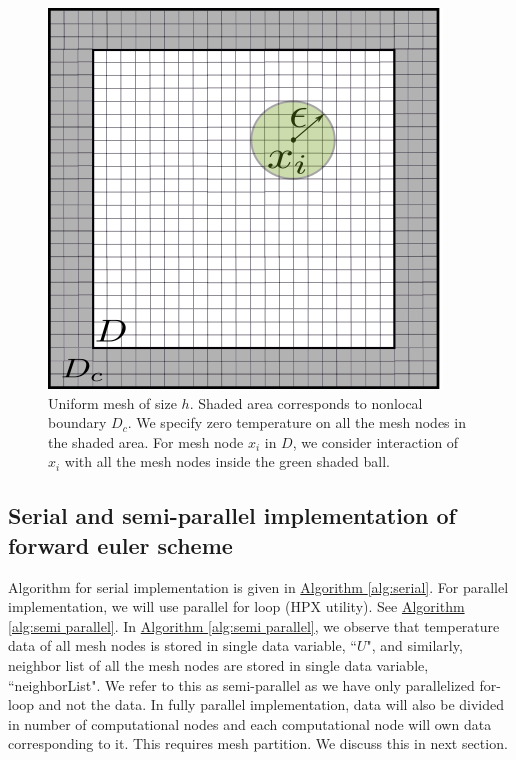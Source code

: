 \documentclass[11pt,twocolumn]{amsart}
\theoremstyle{definition}
\theoremstyle{definition}
\numberwithin{equation}{section}
\numberwithin{equation}{section}
\newcommand{\sref}[2]{\hyperref[#2]{#1 \ref*{#2}}}
\begin{document}
\begin{figure}[ht]
\centering
\includegraphics[scale=0.6]{mesh_uniform.png}
\caption{Uniform mesh of size $h$. Shaded area corresponds to nonlocal boundary $D_c$. We specify zero temperature on all the mesh nodes in the shaded area. For mesh node $x_i$ in $D$, we consider interaction of $x_i$ with all the mesh nodes inside the green shaded ball.}\label{fig:mesh fd}
\end{figure}



\subsection{Serial and semi-parallel implementation of forward euler scheme}
Algorithm for  serial implementation is given in \sref{Algorithm}{alg:serial}. For parallel implementation, we will use parallel for loop (HPX utility). See \sref{Algorithm}{alg:semi parallel}. In \sref{Algorithm}{alg:semi parallel}, we observe that temperature data of all mesh nodes is stored in single data variable, ``$U$", and similarly, neighbor list of all the mesh nodes are stored in single data variable, ``neighborList". We refer to this as semi-parallel as we have only parallelized for-loop and not the data. In fully parallel implementation, data will also be divided in number of computational nodes and each computational node will own data corresponding to it. This requires mesh partition. We discuss this in next section. 
\end{document}

